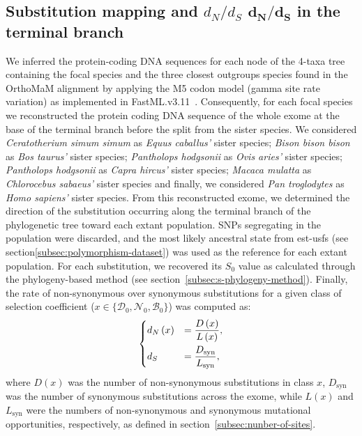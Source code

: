 \documentclass[10pt,letterpaper]{article}
\newcommand{\dn}{d_N}
\newcommand{\ds}{d_S}
\newcommand{\dnds}{\dn / \ds}
\newcommand{\Sphy}{S_{0}}
\newcommand{\SphyDel}{\mathcal{D}_0}
\newcommand{\SphyNeu}{\mathcal{N}_0}
\newcommand{\SphyBen}{\mathcal{B}_0}
\newcommand{\Sphyclass}{x}
\providecommand{\DIFaddtex}[1]{{\protect\color{blue}\uwave{#1}}} %
\providecommand{\DIFdeltex}[1]{{\protect\color{red}\sout{#1}}}                      %
\providecommand{\DIFaddbegin}{} %
\providecommand{\DIFaddend}{} %
\providecommand{\DIFdelbegin}{} %
\providecommand{\DIFdelend}{} %
\providecommand{\DIFadd}[1]{\texorpdfstring{\DIFaddtex{#1}}{#1}} %
\providecommand{\DIFdel}[1]{\texorpdfstring{\DIFdeltex{#1}}{}} %
\newcommand{\DIFscaledelfig}{0.5}
\newlength{\DIFdelgraphicswidth} %
\newlength{\DIFdelgraphicsheight} %
\newcommand{\DIFaddincludegraphics}[2][]{{\color{blue}\fbox{\DIFOincludegraphics[#1]{#2}}}} %
\newcommand{\DIFdelincludegraphics}[2][]{%
\sbox{\DIFdelgraphicsbox}{\DIFOincludegraphics[#1]{#2}}%
\settoboxwidth{\DIFdelgraphicswidth}{\DIFdelgraphicsbox} %
\settoboxtotalheight{\DIFdelgraphicsheight}{\DIFdelgraphicsbox} %
\scalebox{\DIFscaledelfig}{%
\parbox[b]{\DIFdelgraphicswidth}{\usebox{\DIFdelgraphicsbox}\\[-\baselineskip] \rule{\DIFdelgraphicswidth}{0em}}\llap{\resizebox{\DIFdelgraphicswidth}{\DIFdelgraphicsheight}{%
\setlength{\unitlength}{\DIFdelgraphicswidth}%
\begin{picture}(1,1)%
\thicklines\linethickness{2pt} %
{\color[rgb]{1,0,0}\put(0,0){\framebox(1,1){}}}%
{\color[rgb]{1,0,0}\put(0,0){\line( 1,1){1}}}%
{\color[rgb]{1,0,0}\put(0,1){\line(1,-1){1}}}%
\end{picture}%
}\hspace*{3pt}}} %
} %
\DeclareRobustCommand{\DIFaddbegin}{\DIFOaddbegin \let\includegraphics\DIFaddincludegraphics} %
\DeclareRobustCommand{\DIFaddend}{\DIFOaddend \let\includegraphics\DIFOincludegraphics} %
\DeclareRobustCommand{\DIFdelbegin}{\DIFOdelbegin \let\includegraphics\DIFdelincludegraphics} %
\DeclareRobustCommand{\DIFdelend}{\DIFOaddend \let\includegraphics\DIFOincludegraphics} %
\begin{document}
\subsection{Substitution mapping and \DIFdelbegin \DIFdel{$\dnds$ }\DIFdelend \DIFaddbegin \texorpdfstring{$\bm{\dnds}$}{dₙ/dₛ} \DIFaddend in the terminal branch}
\label{subsec:substitution-mapping-in-the-terminal-branch}
We inferred the protein-coding DNA sequences for each node of the 4-taxa tree containing the focal species and the three closest outgroups species found in the OrthoMaM alignment by applying the M5 codon model (gamma site rate variation) as implemented in FastML.v3.11~\cite{ashkenazy_fastml_2012}.
Consequently, for each focal species we reconstructed the protein coding DNA sequence of the whole exome at the base of the terminal branch before the split from the sister species.
We considered \textit{Ceratotherium simum simum} as \textit{Equus caballus'} sister species; \textit{Bison bison bison} as \textit{Bos taurus'} sister species; \textit{Pantholops hodgsonii} as \textit{Ovis aries'} sister species; \textit{Pantholops hodgsonii} as \textit{Capra hircus'} sister species; \textit{Macaca mulatta} as \textit{Chlorocebus sabaeus'} sister species and finally, we considered \textit{Pan troglodytes} as \textit{Homo sapiens'} sister species.
From this reconstructed exome, we determined the direction of the substitution occurring along the terminal branch of the phylogenetic tree toward each extant population.
SNPs segregating in the population were discarded, and the most likely ancestral state from est-usfs (see section\DIFaddbegin \DIFadd{~}\DIFaddend \ref{subsec:polymorphism-dataset}) was used as the reference for each extant population.
For each substitution, we recovered its $\Sphy$ value as calculated through the phylogeny-based method (see section~\ref{subsec:s-phylogeny-method}).
Finally, the rate of non-synonymous over synonymous substitutions for a given class of selection coefficient ($\Sphyclass \in \{\SphyDel, \SphyNeu, \SphyBen \}$) was computed as:
\begin{align}
\begin{dcases}
\dn \left( \Sphyclass \right) &= \dfrac{D\left( \Sphyclass \right)}{L \left( \Sphyclass \right)}, \\
\ds &= \dfrac{D_{\text{syn}}}{L_{\text{syn}}},
\end{dcases}\label{eq:dnds}
\end{align}
where $D \left( \Sphyclass \right) $ was the number of non-synonymous substitutions in class $\Sphyclass$, $D_{\text{syn}}$ was the number of synonymous substitutions across the exome, while $L \left( \Sphyclass \right)$ and $L_{\text{syn}}$ were the numbers of non-synonymous and synonymous mutational opportunities, respectively, as defined in section~\ref{subsec:nunber-of-sites}.
\end{document}
